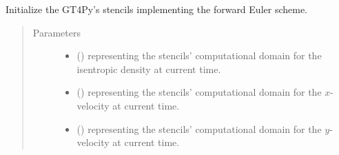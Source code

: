 \documentclass[letterpaper,10pt,english]{sphinxmanual}
\begin{document}
\begin{fulllineitems}
\begin{fulllineitems}
\begin{quote}
\begin{description}
\end{description}\end{quote}

\end{fulllineitems}


\begin{fulllineitems}
\label{\detokenize{api:dycore.prognostic_isentropic_forward_euler.PrognosticIsentropicForwardEuler._stencils_stepping_by_neglecting_vertical_advection_initialize}}
Initialize the GT4Py’s stencils implementing the forward Euler scheme.
\begin{quote}\begin{description}
\item[{Parameters}] \leavevmode\begin{itemize}
\item {} 
 () \textendash{}  representing the stencils’ computational domain for the isentropic density
at current time.

\item {} 
 () \textendash{}  representing the stencils’ computational domain for the \(x\)-velocity
at current time.

\item {} 
 () \textendash{}  representing the stencils’ computational domain for the \(y\)-velocity
at current time.

\end{itemize}

\end{description}\end{quote}


\end{fulllineitems}
\end{fulllineitems}
\end{document}
